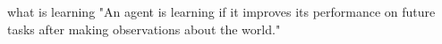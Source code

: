 
what is learning
"An agent is learning if it improves its performance on future tasks after making observations about the world." \cite{russell2016artificial}






